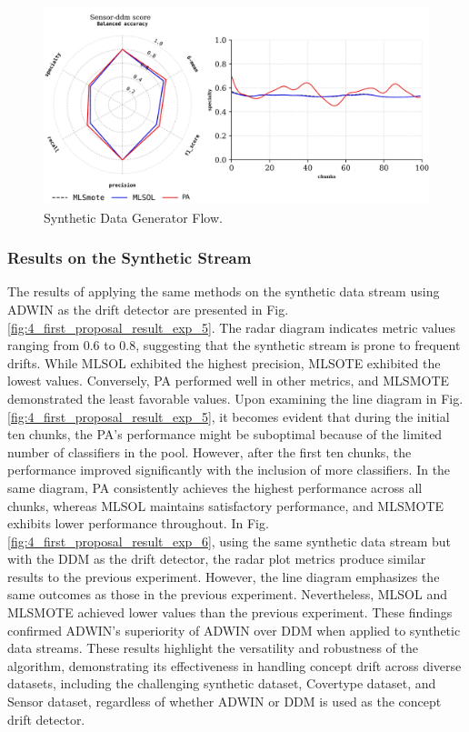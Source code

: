 \begin{figure}[!ht]
	\centering
	\includegraphics[width=1\linewidth]{4_Taxonomy/figures/exp_4.png}
	\caption{Synthetic Data Generator Flow.}
	\label{fig:4_first_proposal_result_exp_4}
\end{figure}


\subsubsection{Results on the Synthetic Stream}
The results of applying the same methods on the synthetic data stream using ADWIN as the drift detector are presented in Fig. \ref{fig:4_first_proposal_result_exp_5}. The radar diagram indicates metric values ranging from 0.6 to 0.8, suggesting that the synthetic stream is prone to frequent drifts. While MLSOL exhibited the highest precision, MLSOTE exhibited the lowest values. Conversely, PA performed well in other metrics, and MLSMOTE demonstrated the least favorable values. Upon examining the line diagram in Fig. \ref{fig:4_first_proposal_result_exp_5}, it becomes evident that during the initial ten chunks, the PA's performance might be suboptimal because of the limited number of classifiers in the pool. However, after the first ten chunks, the performance improved significantly with the inclusion of more classifiers. In the same diagram, PA consistently achieves the highest performance across all chunks, whereas MLSOL maintains satisfactory performance, and MLSMOTE exhibits lower performance throughout. In Fig. \ref{fig:4_first_proposal_result_exp_6}, using the same synthetic data stream but with the DDM as the drift detector, the radar plot metrics produce similar results to the previous experiment. However, the line diagram emphasizes the same outcomes as those in the previous experiment. Nevertheless, MLSOL and MLSMOTE achieved lower values than the previous experiment. These findings confirmed ADWIN's superiority of ADWIN over DDM when applied to synthetic data streams. These results highlight the versatility and robustness of the algorithm, demonstrating its effectiveness in handling concept drift across diverse datasets, including the challenging synthetic dataset, Covertype dataset, and Sensor dataset, regardless of whether ADWIN or DDM is used as the concept drift detector.

